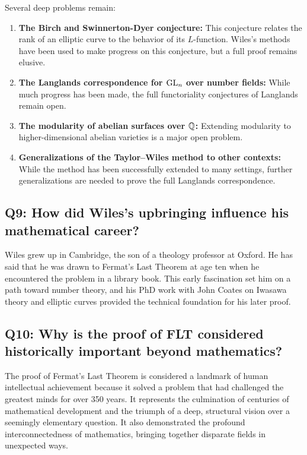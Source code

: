 Several deep problems remain:
\begin{enumerate}
    \item \textbf{The Birch and Swinnerton-Dyer conjecture:} This conjecture relates the rank of an elliptic curve to the behavior of its \(L\)-function. Wiles's methods have been used to make progress on this conjecture, but a full proof remains elusive.
    \item \textbf{The Langlands correspondence for \(\operatorname{GL}_n\) over number fields:} While much progress has been made, the full functoriality conjectures of Langlands remain open.
    \item \textbf{The modularity of abelian surfaces over \(\mathbb{Q}\):} Extending modularity to higher-dimensional abelian varieties is a major open problem.
    \item \textbf{Generalizations of the Taylor--Wiles method to other contexts:} While the method has been successfully extended to many settings, further generalizations are needed to prove the full Langlands correspondence.
\end{enumerate}

\subsection*{Q9: How did Wiles's upbringing influence his mathematical career?}

Wiles grew up in Cambridge, the son of a theology professor at Oxford. He has said that he was drawn to Fermat's Last Theorem at age ten when he encountered the problem in a library book. This early fascination set him on a path toward number theory, and his PhD work with John Coates on Iwasawa theory and elliptic curves provided the technical foundation for his later proof.

\subsection*{Q10: Why is the proof of FLT considered historically important beyond mathematics?}

The proof of Fermat's Last Theorem is considered a landmark of human intellectual achievement because it solved a problem that had challenged the greatest minds for over 350 years. It represents the culmination of centuries of mathematical development and the triumph of a deep, structural vision over a seemingly elementary question. It also demonstrated the profound interconnectedness of mathematics, bringing together disparate fields in unexpected ways.

